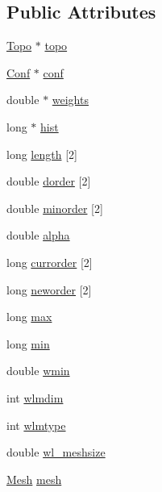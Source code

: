 \subsection*{Public Attributes}
\begin{DoxyCompactItemize}
\item 
\hyperlink{class_topo}{Topo} $\ast$ \hyperlink{class_wang_landau_a501fc7de450a2e78e5817331ec748517}{topo}
\item 
\hyperlink{class_conf}{Conf} $\ast$ \hyperlink{class_wang_landau_acffd727c52c62ecf4bb12afbef005f91}{conf}
\item 
double $\ast$ \hyperlink{class_wang_landau_ad496dccf54ec8d44362b51e4e9df6a0a}{weights}
\item 
long $\ast$ \hyperlink{class_wang_landau_aeec23524069d5194edccbe4a62337b49}{hist}
\item 
long \hyperlink{class_wang_landau_a252b732514b252e242214c9af3d5a462}{length} \mbox{[}2\mbox{]}
\item 
double \hyperlink{class_wang_landau_afaa523a1ec9e61fcb7045fafd2612482}{dorder} \mbox{[}2\mbox{]}
\item 
double \hyperlink{class_wang_landau_a8e8133ccc74e6d1c04d1cabc6ec7f75b}{minorder} \mbox{[}2\mbox{]}
\item 
double \hyperlink{class_wang_landau_a8bb1140ae96416553fe3c286e33446fa}{alpha}
\item 
long \hyperlink{class_wang_landau_a1d6cf967b7c33ff4140109e17df8c842}{currorder} \mbox{[}2\mbox{]}
\item 
long \hyperlink{class_wang_landau_a0b32be956e40083026f9b8bb1021f30b}{neworder} \mbox{[}2\mbox{]}
\item 
long \hyperlink{class_wang_landau_ad2954970aa554f2ea0031d943eab9bb7}{max}
\item 
long \hyperlink{class_wang_landau_ab863f19bb4921b6f3cd4f9dbe062cef2}{min}
\item 
double \hyperlink{class_wang_landau_a322c81039b5e71972667d3fac00e2576}{wmin}
\item 
int \hyperlink{class_wang_landau_a7ad19ee80822168ea3ee712529f1b96d}{wlmdim}
\item 
int \hyperlink{class_wang_landau_ae307e86eafae0c11461c0beac5462868}{wlmtype}
\item 
double \hyperlink{class_wang_landau_ae8655cc00c6200de6523e4eef767d5ed}{wl\+\_\+meshsize}
\item 
\hyperlink{class_mesh}{Mesh} \hyperlink{class_wang_landau_a9ba65a2907470556cf8dae45ffdf9085}{mesh}
\item 

\end{DoxyCompactItemize}
